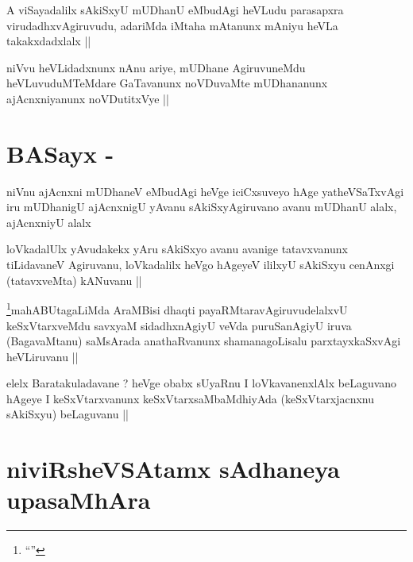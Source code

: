 
\begin{artha}
A viSayadalilx sAkiSxyU mUDhanU eMbudAgi heVLudu parasapxra
virudadhxvAgiruvudu, adariMda iMtaha mAtanunx mAniyu heVLa
takakxdadxlalx ||
\end{artha}

\begin{artha}
niVvu heVLidadxnunx nAnu ariye, mUDhane AgiruvuneMdu heVLuvuduMTeMdare
GaTavanunx noVDuvaMte mUDhananunx ajAcnxniyanunx noVDutitxVye ||
\end{artha}

\section*{BASayx -}


\begin{artha}
niVnu ajAcnxni mUDhaneV eMbudAgi heVge iciCxsuveyo hAge yatheVSaTxvAgi
iru mUDhanigU ajAcnxnigU yAvanu sAkiSxyAgiruvano avanu mUDhanU alalx,
ajAcnxniyU alalx
\end{artha}


\begin{artha}
loVkadalUlx yAvudakekx yAru sAkiSxyo avanu avanige tatavxvanunx
tiLidavaneV Agiruvanu, loVkadalilx heVgo hAgeyeV ililxyU sAkiSxyu
cenAnxgi (tatavxveMta) kANuvanu ||
\end{artha}

\begin{artha}
\footnote{``\stext''}mahABUtagaLiMda AraMBisi dhaqti payaRMtaravAgiruvudelalxvU
keSxVtarxveMdu savxyaM sidadhxnAgiyU veVda puruSanAgiyU iruva
(BagavaMtanu) saMsArada anathaRvanunx shamanagoLisalu parxtayxkaSxvAgi
heVLiruvanu ||
\end{artha}


\begin{artha}
elelx Baratakuladavane ? heVge obabx sUyaRnu I loVkavanenxlAlx
beLaguvano hAgeye I keSxVtarxvanunx keSxVtarxsaMbaMdhiyAda
(keSxVtarxjacnxnu sAkiSxyu) beLaguvanu ||
\end{artha}

\section*{niviRsheVSAtamx sAdhaneya upasaMhAra}

